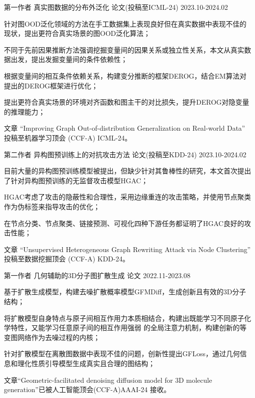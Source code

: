 \begin{cventries}

\cventry
{第一作者} %
{真实图数据的分布外泛化} %
{论文(投稿至ICML-24)} %
{2023.10-2024.02} %
{
  \begin{cvitems} 
    \item {针对图OOD泛化领域的方法在手工数据集上表现良好但在真实数据中表现不佳的现状，提出更符合真实场景的图OOD泛化算法；}
    \item {不同于先前因果推断方法强调挖掘变量间的因果关系或独立性关系，本文从真实数据出发，提出发掘变量间的条件依赖性；}
    \item {根据变量间的相互条件依赖关系，构建变分推断的框架DEROG，结合EM算法对提出的DEROG框架进行优化；}
    \item {提出更符合真实场景的环境对齐函数和图主干的对比损失，提升DEROG对隐变量的推理能力；}
    \item {文章 “Improving Graph Out-of-distribution Generalization on Real-world Data” 投稿至机器学习顶会 (CCF-A) ICML-24。}
  \end{cvitems}
}

\cventry
{第二作者} %
{异构图预训练上的对抗攻击方法} %
{论文(投稿至KDD-24)} %
{2023.10-2024.02} %
{
  \begin{cvitems} 
    \item {目前大量的异构图预训练模型被提出，但缺少针对其鲁棒性的研究，本文首次提出了针对异构图预训练的无监督攻击模型HGAC；}
    \item {HGAC考虑了攻击的隐蔽性和合理性，采用边缘重连的攻击策略，并使用节点聚类作为伪标签来指导攻击的优化；}
    \item {在节点分类、节点聚类、链接预测、可视化四种下游任务都证明了HGAC良好的攻击性能；}
    \item {文章 “Unsupervised Heterogeneous Graph Rewriting Attack via Node Clustering” 投稿至数据挖掘顶会 (CCF-A) KDD-24。}
  \end{cvitems}
}

\cventry
{第一作者} %
{几何辅助的3D分子图扩散生成} %
{论文} %
{2022.11-2023.08} %
{
  \begin{cvitems} 
    \item {基于扩散生成模型，构建去噪扩散概率模型GFMDiff，生成创新且有效的3D分子结构；}
    \item {将扩散模型自身特点与原子间相互作用力本质相结合，构建出既能学习不同原子化学特性，又能学习任意原子间的相互作用强弱
    的全局注意力机制，构建创新的等变图网络作为去噪过程的内核；}
    \item {针对扩散模型在离散图数据中表现不佳的问题，创新性提出GFLoss，通过几何信息和理化性质引导模型生成真实且合理的图结构；}
    \item {文章“Geometric-facilitated denoising diffusion model for 3D molecule generation”已被人工智能顶会(CCF-A)AAAI-24 接收。}
  \end{cvitems}
}


\end{cventries}
